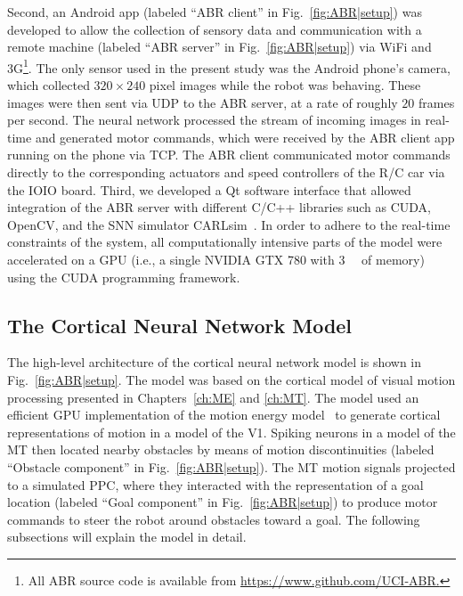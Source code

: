 Second, an Android app (labeled ``ABR client'' in 
Fig.~\ref{fig:ABR|setup}) was developed
to allow the collection of sensory data and communication
with a remote machine (labeled ``ABR server'' in 
Fig.~\ref{fig:ABR|setup}) via WiFi and 
3G\footnote{All ABR source code is available from \url{https://www.github.com/UCI-ABR.}}.
The only sensor used in the present study was the Android
phone's camera, which collected $320\times240$ pixel images while the
robot was behaving. These images were then sent via \ac{UDP} to the
\ac{ABR} server, 
at a rate of roughly $20$ frames per second. The neural
network processed the stream of incoming images in real-time
and generated motor commands, which were received by the \ac{ABR}
client app running on the phone via \ac{TCP}. The \ac{ABR} client communicated
motor commands directly to the corresponding actuators
and speed controllers of the R/C car via the IOIO board.
Third, we developed a Qt software interface that allowed integration
of the \ac{ABR} server with different C/C++ libraries such
as \ac{CUDA}, OpenCV, and the \ac{SNN} simulator
CARLsim~\citep{Beyeler2015a,Nageswaran2009,Richert2011}.
In order to adhere to the real-time constraints of the system, 
all computationally intensive
parts of the model were accelerated on a \ac{GPU} (i.e., a single
NVIDIA GTX 780 with \SI{3}{\giga\byte} of memory) 
using the \ac{CUDA} programming framework.


\subsection{The Cortical Neural Network Model}
\label{sec:ABR|model}

The high-level architecture of the cortical neural network
model is shown in Fig.~\ref{fig:ABR|setup}. 
The model was based on the cortical model of visual motion
processing presented in 
Chapters~\ref{ch:ME} and \ref{ch:MT}. 
The model
used an efficient \ac{GPU} implementation of the 
motion energy model~\citep{SimoncelliHeeger1998}
to generate cortical representations
of motion in a model of the \acf{V1}. Spiking
neurons in a model of the \acf{MT} then
located nearby obstacles by means of motion discontinuities
(labeled ``Obstacle component'' in Fig.~\ref{fig:ABR|setup}). 
The \ac{MT} motion signals
projected to a simulated \acf{PPC}, where they
interacted with the representation of a goal location
(labeled ``Goal component'' in Fig.~\ref{fig:ABR|setup})
to produce motor commands to steer the
robot around obstacles toward a goal. The following subsections
will explain the model in detail.



